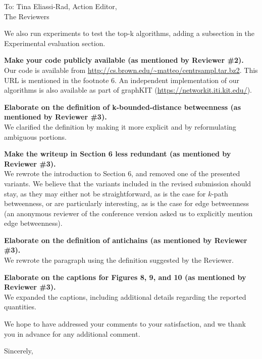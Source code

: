 \documentclass{letter}
\begin{document}
\begin{letter}{To: Tina Eliassi-Rad, Action Editor,\\%
	\qquad The Reviewers}
\begin{enumerate*}
		We also run experiments to test the top-k algorithms, adding a
		subsection in the Experimental evaluation section.
	\item {\bf Make your code publicly available (as mentioned by Reviewer
		\#2).}\\
		Our code is available from
		\url{http://cs.brown.edu/~matteo/centrsampl.tar.bz2}. This URL is
		mentioned in the footnote 6. An independent implementation of our
		algorithms is also available as part of graphKIT
		(\url{https://networkit.iti.kit.edu/}).
	\item {\bf Elaborate on the definition of k-bounded-distance betweenness (as
		mentioned by Reviewer \#3).}\\
		We clarified the definition by making it more explicit and by
		reformulating ambiguous portions.
	\item {\bf Make the writeup in Section 6 less redundant (as mentioned by Reviewer
		\#3).}\\
		We rewrote the introduction to Section 6, and removed one of the
		presented variants. We believe that the variants included in the revised
		submission should stay, as they may either not be
		straightforward, as is the case for $k$-path betweenness, or are
		particularly interesting, as is the case for edge betweenness (an
		anonymous reviewer of the conference version asked us to explicitly
		mention edge betweenness).
	\item {\bf Elaborate on the definition of antichains (as mentioned by Reviewer
		\#3).}\\
		We rewrote the paragraph using the definition suggested by the Reviewer.
	\item {\bf Elaborate on the captions for Figures 8, 9, and 10 (as mentioned by
		Reviewer \#3).}\\
		We expanded the captions, including additional details regarding the
		reported quantities.
\end{enumerate*}

We hope to have addressed your comments to your satisfaction, and we thank you
in advance for any additional comment.
\closing{Sincerely,}
\end{letter}
\end{document}
